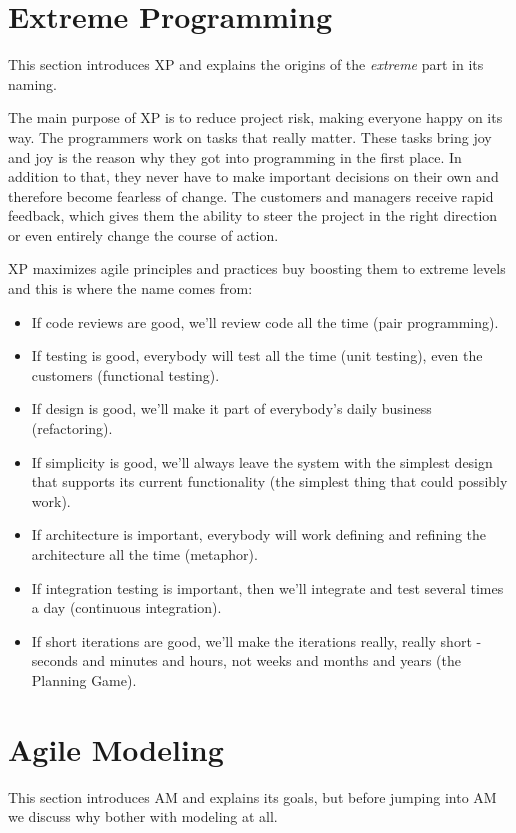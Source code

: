 \section{Extreme Programming}
This section introduces XP and explains the origins of the \emph{extreme}
part in its naming.

The main purpose of XP is to reduce project risk, making everyone happy on its
way. The programmers work on tasks that really matter. These tasks bring joy and
joy is the reason why they got into programming in the first place. In
addition to that, they never have to make important decisions on their own and
therefore become fearless of change. The customers and managers receive rapid
feedback, which gives them the ability to steer the project in the right
direction or even entirely change the course of action.\cite{BeckAndres200411}

XP maximizes agile principles and practices buy boosting them to extreme levels
and this is where the name comes from:
\begin{itemize}
\item If code reviews are good, we'll review code all the time (pair
programming).
\item If testing is good, everybody will test all the time (unit testing), even
the customers (functional testing).
\item If design is good, we'll make it part of everybody's daily business
(refactoring).
\item If simplicity is good, we'll always leave the system with the simplest
design that supports its current functionality (the simplest thing that could
possibly work).
\item If architecture is important, everybody will work defining and refining
the architecture all the time (metaphor).
\item If integration testing is important, then we'll integrate and test
several times a day (continuous integration).
\item If short iterations are good, we'll make the iterations really, really
short - seconds and minutes and hours, not weeks and months and years (the
Planning Game).\cite{BeckAndres200411}
\end{itemize}

\section{Agile Modeling}
This section introduces AM and explains its goals, but before jumping into AM we
discuss why bother with modeling at all.

